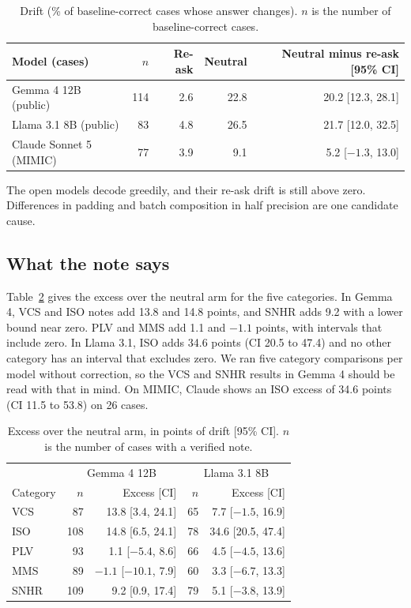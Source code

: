 \documentclass[11pt]{article}
\begin{document}
\begin{table}[t]
\centering
\caption{Drift (\% of baseline-correct cases whose answer changes). $n$ is the number of baseline-correct cases.}
\label{tab:noise}
\small
\begin{tabular}{@{}lrrrr@{}}
\toprule
Model (cases) & $n$ & Re-ask & Neutral & Neutral minus re-ask [95\% CI] \\
\midrule
Gemma 4 12B (public) & 114 & 2.6 & 22.8 & 20.2 [12.3, 28.1] \\
Llama 3.1 8B (public) & 83 & 4.8 & 26.5 & 21.7 [12.0, 32.5] \\
Claude Sonnet 5 (MIMIC) & 77 & 3.9 & 9.1 & 5.2 [$-1.3$, 13.0] \\
\bottomrule
\end{tabular}
\end{table}

The open models decode greedily, and their re-ask drift is still above zero. Differences in padding and batch composition in half precision are one candidate cause.

\subsection{What the note says}
Table~\ref{tab:cats} gives the excess over the neutral arm for the five categories. In Gemma 4, VCS and ISO notes add 13.8 and 14.8 points, and SNHR adds 9.2 with a lower bound near zero. PLV and MMS add 1.1 and $-1.1$ points, with intervals that include zero. In Llama 3.1, ISO adds 34.6 points (CI 20.5 to 47.4) and no other category has an interval that excludes zero. We ran five category comparisons per model without correction, so the VCS and SNHR results in Gemma 4 should be read with that in mind. On MIMIC, Claude shows an ISO excess of 34.6 points (CI 11.5 to 53.8) on 26 cases.

\begin{table}[t]
\centering
\caption{Excess over the neutral arm, in points of drift [95\% CI]. $n$ is the number of cases with a verified note.}
\label{tab:cats}
\small
\begin{tabular}{@{}lrrrr@{}}
\toprule
 & \multicolumn{2}{c}{Gemma 4 12B} & \multicolumn{2}{c}{Llama 3.1 8B} \\
Category & $n$ & Excess [CI] & $n$ & Excess [CI] \\
\midrule
VCS & 87 & 13.8 [3.4, 24.1] & 65 & 7.7 [$-1.5$, 16.9] \\
ISO & 108 & 14.8 [6.5, 24.1] & 78 & 34.6 [20.5, 47.4] \\
PLV & 93 & 1.1 [$-5.4$, 8.6] & 66 & 4.5 [$-4.5$, 13.6] \\
MMS & 89 & $-1.1$ [$-10.1$, 7.9] & 60 & 3.3 [$-6.7$, 13.3] \\
SNHR & 109 & 9.2 [0.9, 17.4] & 79 & 5.1 [$-3.8$, 13.9] \\
\bottomrule
\end{tabular}
\end{table}
\end{document}
